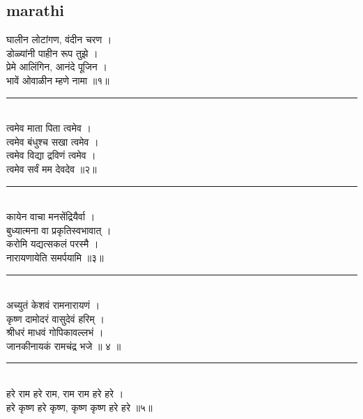 \documentclass[letterpaper,twocolumn,openany,nodeprecatedcode]{dndbook}
\begin{document}
\begin{flushleft}
  \section*{marathi}
  घालीन लोटांगण, वंदीन चरण । \\
  डोळ्यांनी पाहीन रूप तुझे । \\
  प्रेमे आलिंगिन, आनंदे पूजिन । \\
  भावें ओवाळीन म्हणे नामा ॥१॥ \\
  \rule{\linewidth}{1pt} \\
  त्वमेव माता पिता त्वमेव । \\
  त्वमेव बंधुश्च सखा त्वमेव । \\
  त्वमेव विद्या द्रविणं त्वमेव । \\
  त्वमेव सर्वं मम देवदेव ॥२॥ \\
  \rule{\linewidth}{1pt} \\
  कायेन वाचा मनसेंद्रियैर्वा । \\
  बुध्यात्मना वा प्रकृतिस्वभावात् । \\
  करोमि यद्यत्सकलं परस्मै । \\
  नारायणायेति समर्पयामि ॥३॥ \\
  \rule{\linewidth}{1pt} \\
  अच्युतं केशवं रामनारायणं । \\
  कृष्ण दामोदरं वासुदेवं हरिम् । \\
  श्रीधरं माधवं गोपिकावल्लभं । \\
  जानकीनायकं रामचंद्र भजे ॥ ४ ॥ \\
  \rule{\linewidth}{1pt} \\
  हरे राम हरे राम, राम राम हरे हरे । \\
  हरे कृष्ण हरे कृष्ण, कृष्ण कृष्ण हरे हरे ॥५॥ \\
  \pagebreak

\end{flushleft}
\end{document}

